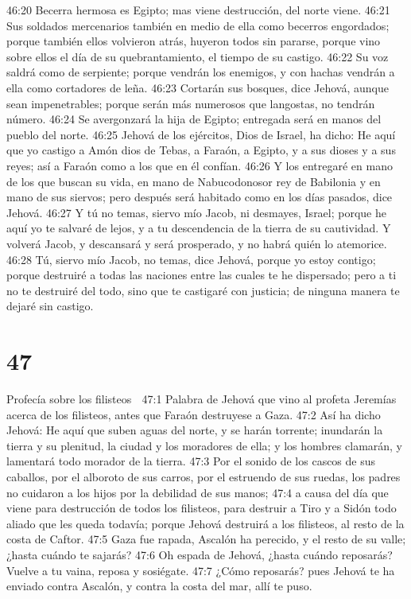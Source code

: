 46:20 Becerra hermosa es Egipto; mas viene destrucción, del norte viene.  
46:21 Sus soldados mercenarios también en medio de ella como becerros engordados; porque también ellos volvieron atrás, huyeron todos sin pararse, porque vino sobre ellos el día de su quebrantamiento, el tiempo de su castigo.  
46:22 Su voz saldrá como de serpiente; porque vendrán los enemigos, y con hachas vendrán a ella como cortadores de leña.  
46:23 Cortarán sus bosques, dice Jehová, aunque sean impenetrables; porque serán más numerosos que langostas, no tendrán número.  
46:24 Se avergonzará la hija de Egipto; entregada será en manos del pueblo del norte.  
46:25 Jehová de los ejércitos, Dios de Israel, ha dicho: He aquí que yo castigo a Amón dios de Tebas, a Faraón, a Egipto, y a sus dioses y a sus reyes; así a Faraón como a los que en él confían.  
46:26 Y los entregaré en mano de los que buscan su vida, en mano de Nabucodonosor rey de Babilonia y en mano de sus siervos; pero después será habitado como en los días pasados, dice Jehová. 
46:27 Y tú no temas, siervo mío Jacob, ni desmayes, Israel; porque he aquí yo te salvaré de lejos, y a tu descendencia de la tierra de su cautividad. Y volverá Jacob, y descansará y será prosperado, y no habrá quién lo atemorice.  
46:28 Tú, siervo mío Jacob, no temas, dice Jehová, porque yo estoy contigo; porque destruiré a todas las naciones entre las cuales te he dispersado; pero a ti no te destruiré del todo, sino que te castigaré con justicia; de ninguna manera te dejaré sin castigo.   

\chapter{47}

Profecía sobre los filisteos  

47:1 Palabra de Jehová que vino al profeta Jeremías acerca de los filisteos, antes que Faraón destruyese a Gaza.  
47:2 Así ha dicho Jehová: He aquí que suben aguas del norte, y se harán torrente; inundarán la tierra y su plenitud, la ciudad y los moradores de ella; y los hombres clamarán, y lamentará todo morador de la tierra.  
47:3 Por el sonido de los cascos de sus caballos, por el alboroto de sus carros, por el estruendo de sus ruedas, los padres no cuidaron a los hijos por la debilidad de sus manos;  
47:4 a causa del día que viene para destrucción de todos los filisteos, para destruir a Tiro y a Sidón todo aliado que les queda todavía; porque Jehová destruirá a los filisteos, al resto de la costa de Caftor.  
47:5 Gaza fue rapada, Ascalón ha perecido, y el resto de su valle; ¿hasta cuándo te sajarás?  
47:6 Oh espada de Jehová, ¿hasta cuándo reposarás? Vuelve a tu vaina, reposa y sosiégate.  
47:7 ¿Cómo reposarás? pues Jehová te ha enviado contra Ascalón, y contra la costa del mar, allí te puso.  

